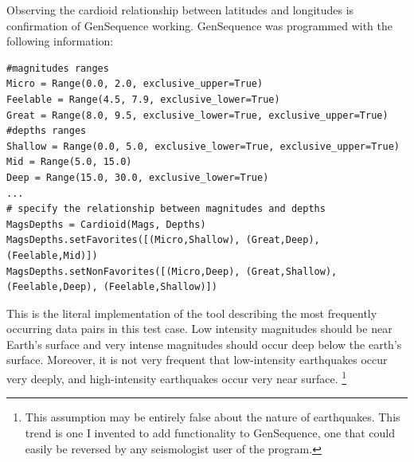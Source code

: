 \noindent{}

\vspace{1cm}
Observing the cardioid relationship between latitudes and longitudes is confirmation of GenSequence working. GenSequence was programmed with the following information:
\vspace{1cm}

\begin{lstlisting}
#magnitudes ranges
Micro = Range(0.0, 2.0, exclusive_upper=True)
Feelable = Range(4.5, 7.9, exclusive_lower=True)
Great = Range(8.0, 9.5, exclusive_lower=True, exclusive_upper=True)
#depths ranges
Shallow = Range(0.0, 5.0, exclusive_lower=True, exclusive_upper=True)
Mid = Range(5.0, 15.0)
Deep = Range(15.0, 30.0, exclusive_lower=True)
...
# specify the relationship between magnitudes and depths
MagsDepths = Cardioid(Mags, Depths)
MagsDepths.setFavorites([(Micro,Shallow), (Great,Deep), (Feelable,Mid)])
MagsDepths.setNonFavorites([(Micro,Deep), (Great,Shallow), (Feelable,Deep), (Feelable,Shallow)])
\end{lstlisting}

\vspace{1cm}
This is the literal implementation of the tool describing the most frequently occurring data pairs in this test case. Low intensity magnitudes should be near Earth's surface and very intense magnitudes should occur deep below the earth's surface. Moreover, it is not very frequent that low-intensity earthquakes occur very deeply, and high-intensity earthquakes occur very near surface. \footnote{This assumption may be entirely false about the nature of earthquakes. This trend is one I invented to add functionality to GenSequence, one that could easily be reversed by any seismologist user of the program.}

